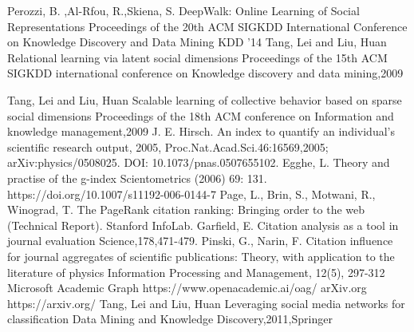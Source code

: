 \documentclass[a4paper, 11pt]{article}
\begin{document}
\begin{thebibliography}{9}
Perozzi, B. ,Al-Rfou, R.,Skiena, S.
\newblock DeepWalk: Online Learning of Social Representations
\newblock Proceedings of the 20th ACM SIGKDD International Conference on Knowledge Discovery and Data Mining
\newblock KDD '14
Tang, Lei and Liu, Huan
\newblock Relational learning via latent social dimensions
\newblock Proceedings of the 15th ACM SIGKDD international conference on Knowledge discovery and data mining,2009



Tang, Lei and Liu, Huan
 \newblock Scalable learning of collective behavior based on sparse social dimensions
  \newblock Proceedings of the 18th ACM conference on Information and knowledge management,2009
J. E. Hirsch.
\newblock An index to quantify an individual's scientific research output, 2005,
\newblock Proc.Nat.Acad.Sci.46:16569,2005;
\newblock arXiv:physics/0508025.
\newblock DOI: 10.1073/pnas.0507655102.
Egghe, L.
\newblock  Theory and practise of the g-index
\newblock Scientometrics (2006) 69: 131.
\newblock https://doi.org/10.1007/s11192-006-0144-7
Page, L., Brin, S., Motwani, R., Winograd, T. 
\newblock  The PageRank citation ranking: Bringing order to the web  
\newblock  (Technical Report). Stanford InfoLab.
Garfield, E.
\newblock  Citation analysis as a tool in journal evaluation
\newblock Science,178,471-479.
Pinski, G.,  Narin, F. 
\newblock Citation influence for journal aggregates of scientific publications: Theory, with application to the literature of physics
\newblock  Information Processing and Management, 12(5), 297-312
Microsoft Academic Graph 
\newblock https://www.openacademic.ai/oag/
arXiv.org
\newblock  https://arxiv.org/
  Tang, Lei and Liu, Huan
  \newblock Leveraging social media networks for classification
  \newblock Data Mining and Knowledge Discovery,2011,Springer
 
\end{thebibliography}

\listoffigures
\end{document}
